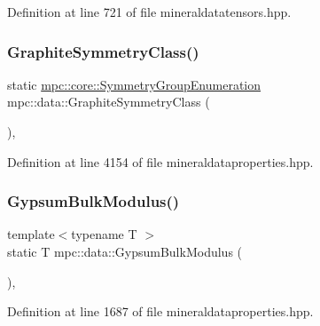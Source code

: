 Definition at line 721 of file mineraldatatensors.\+hpp.

\mbox{\label{namespacempc_1_1data_a0ffa3bb4287e170653682a58ac21b455}} 
\subsubsection{\texorpdfstring{Graphite\+Symmetry\+Class()}{GraphiteSymmetryClass()}}
{\footnotesize\ttfamily static \mbox{\hyperlink{namespacempc_1_1core_a9d979684062547055a0ef5c13077bad8}{mpc\+::core\+::\+Symmetry\+Group\+Enumeration}} mpc\+::data\+::\+Graphite\+Symmetry\+Class (\begin{DoxyParamCaption}{ }\end{DoxyParamCaption})\hspace{0.3cm}{\ttfamily [inline]}, {\ttfamily [static]}}



Definition at line 4154 of file mineraldataproperties.\+hpp.

\mbox{\label{namespacempc_1_1data_a353d25ef0cef4ba4da0fcb65cc6837fe}} 
\subsubsection{\texorpdfstring{Gypsum\+Bulk\+Modulus()}{GypsumBulkModulus()}}
{\footnotesize\ttfamily template$<$typename T $>$ \\
static T mpc\+::data\+::\+Gypsum\+Bulk\+Modulus (\begin{DoxyParamCaption}{ }\end{DoxyParamCaption})\hspace{0.3cm}{\ttfamily [inline]}, {\ttfamily [static]}}



Definition at line 1687 of file mineraldataproperties.\+hpp.

\mbox{\label{namespacempc_1_1data_a77f3d1f6a18679d3a1661409c80b3199}} 
